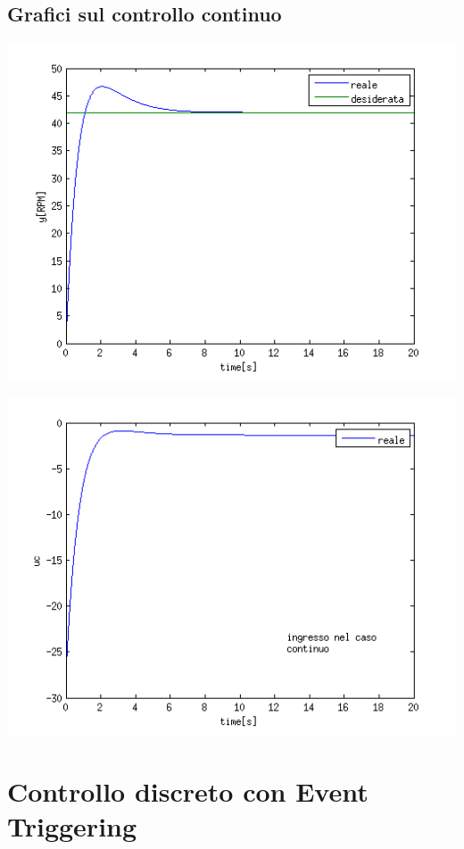\documentclass[a4paper,13pt]{article}
\begin{document}
\subsection{Grafici sul controllo continuo}
\begin{center}
\includegraphics[scale=0.6]{graph/ycont.png}
\end{center}
\begin{center}
\includegraphics[scale=0.6]{graph/ucont.png}
\end{center}


\section{Controllo discreto con Event Triggering}
\end{document}
